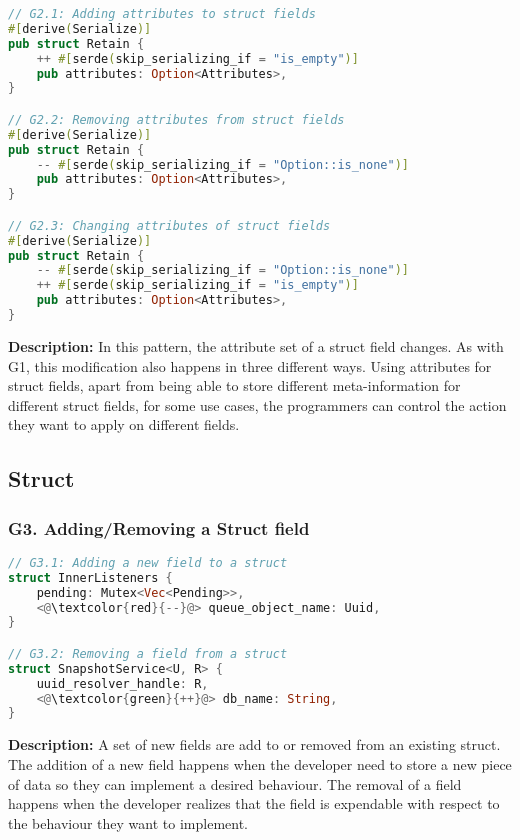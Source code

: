 \begin{lstlisting}[language=Rust, style=colouredRust, label={l3}]
// G2.1: Adding attributes to struct fields
#[derive(Serialize)]
pub struct Retain {
    ++ #[serde(skip_serializing_if = "is_empty")]
    pub attributes: Option<Attributes>,
}

// G2.2: Removing attributes from struct fields
#[derive(Serialize)]
pub struct Retain {
    -- #[serde(skip_serializing_if = "Option::is_none")]
    pub attributes: Option<Attributes>,
}

// G2.3: Changing attributes of struct fields
#[derive(Serialize)]
pub struct Retain {
    -- #[serde(skip_serializing_if = "Option::is_none")]
    ++ #[serde(skip_serializing_if = "is_empty")]
    pub attributes: Option<Attributes>,
}
\end{lstlisting}

\noindent \textbf{Description:} In this pattern, the attribute set of a struct field changes. As with G1, this modification also happens in three different ways. Using attributes for struct fields, apart from being able to store different meta-information for different struct fields, for some use cases, the programmers can control the action they want to apply on different fields.

\subsection{Struct}
\subsubsection{G3. Adding/Removing a Struct field}

\begin{lstlisting}[language=Rust, style=colouredRust, label={l3}]
// G3.1: Adding a new field to a struct
struct InnerListeners {
    pending: Mutex<Vec<Pending>>,
    <@\textcolor{red}{--}@> queue_object_name: Uuid,
}

// G3.2: Removing a field from a struct
struct SnapshotService<U, R> {
    uuid_resolver_handle: R,
    <@\textcolor{green}{++}@> db_name: String,
}
\end{lstlisting}

\noindent \textbf{Description:} A set of new fields are add to or removed from an existing struct. The addition of a new field happens when the developer need to store a new piece of data so they can implement a desired behaviour. The removal of a field  happens when the developer realizes that the field is expendable with respect to the behaviour they want to implement.

